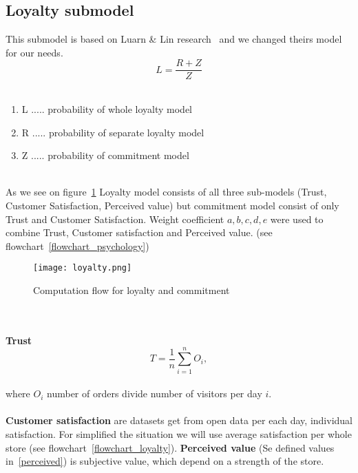 \subsection{Loyalty submodel} \label{subsec:model_loyalty}
This submodel is based on Luarn \& Lin research~\cite{luarn} and we changed theirs model for our needs.\\
\begin{equation} \label{eq:19}
L = \frac{R+Z}{Z}
\end{equation}
\\
\begin{enumerate}
    \item L ..... probability of whole loyalty model
    \item R ..... probability of separate loyalty model
    \item Z ..... probability of commitment model
\end{enumerate}
\\
As we see on figure~\ref{Loyalty scheme} Loyalty model consists of all three sub-models (Trust, Customer Satisfaction, Perceived value)
but commitment model consist of only Trust and Customer Satisfaction.
Weight coefficient $a,b,c,d,e$ were used to combine Trust, Customer satisfaction and Perceived value. (see flowchart~\ref{flowchart_psychology})\\
\begin{figure}[h!]
    \begin{center}
        \texttt{[image: loyalty.png]}
    \end{center}
    \caption{Computation flow for loyalty and commitment~\cite{luarn}}
    \label{Loyalty scheme}
\end{figure}\\
\\
\textbf{Trust}
\begin{equation} \label{eq:20}
T = \frac{1}{n} \sum_{i=1}^{n} O_i,
\end{equation}
\\
where $O_i$ number of orders divide number of visitors per day $i$.
\\
\\
\textbf{Customer satisfaction} are datasets get from open data per each day, individual satisfaction.
For simplified the situation we will use average satisfaction per whole store (see flowchart~\ref{flowchart_loyalty}).
\textbf{Perceived value} (Se defined values in~\ref{perceived}) is subjective value, which depend on a strength of the store.
